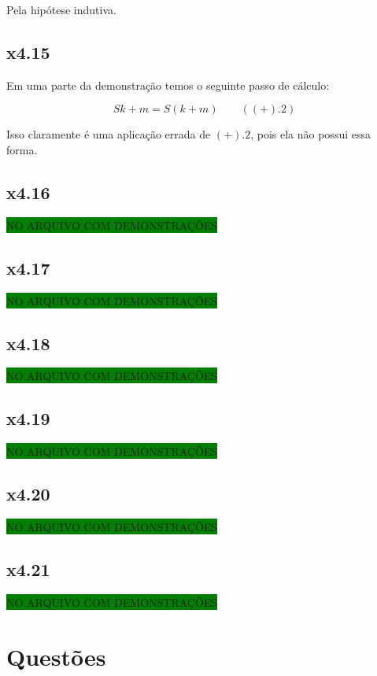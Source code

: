 \documentclass[portuguese,a4paper,12pt]{article}
\begin{document}
	Pela hipótese indutiva.
	
	\subsection*{x4.15}
	
	Em uma parte da demonstração temos o seguinte passo de cálculo:
	
	\[
	Sk + m = S(k + m) \qquad ((+).2)
	\]
	
	Isso claramente é uma aplicação errada de $(+).2$, pois ela não possui essa forma.
	
	\subsection*{x4.16}
	
	\colorbox{green}{NO ARQUIVO COM DEMONSTRAÇÕES}
	
	\subsection*{x4.17}
	
	\colorbox{green}{NO ARQUIVO COM DEMONSTRAÇÕES}
	
	\subsection*{x4.18}
	
	\colorbox{green}{NO ARQUIVO COM DEMONSTRAÇÕES}
	
	\subsection*{x4.19}
	
	\colorbox{green}{NO ARQUIVO COM DEMONSTRAÇÕES}
	
	\subsection*{x4.20}
	
	\colorbox{green}{NO ARQUIVO COM DEMONSTRAÇÕES}
	
	\subsection*{x4.21}
	
	\colorbox{green}{NO ARQUIVO COM DEMONSTRAÇÕES}
	
	\section*{\centering Questões}
	
\end{document}
